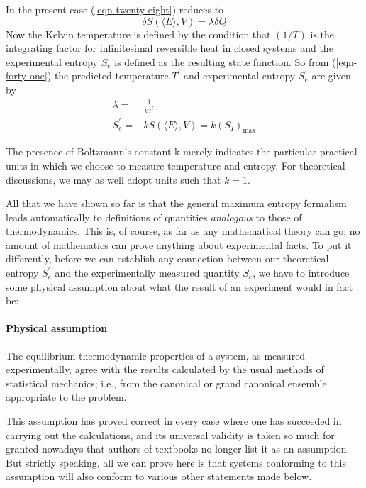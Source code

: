\documentclass[]{article}
\begin{document}
In the present case (\ref{eqn-twenty-eight}) reduces to
\begin{equation}
\delta S(\langle E\rangle, V)=\lambda \delta Q \label{eqn-forty-one}
\end{equation}
Now the Kelvin temperature is defined by the condition that $(1 / T)$ is the integrating factor for infinitesimal reversible heat in closed systems and the experimental entropy $S_{e}$ is defined as the resulting state function. So from (\ref{eqn-forty-one}) the predicted temperature $T^\prime$ and experimental entropy $S _{ e }^{\prime}$ are given by
%
\begin{align}
\lambda= & \frac{1}{ kT ^{\prime}} \\
S _{ e }^{\prime}= & kS (\langle E \rangle, V )= k \left( S _{ I }\right)_{\max }
\end{align}

The presence of Boltzmann's constant k merely indicates the particular practical units in which we choose to measure temperature and entropy. For theoretical discussions, we may as well adopt units such that $k=1$.

All that we have shown so far is that the general maximum entropy formalism leads automatically to definitions of quantities \emph{analogous} to those of thermodynamics. This is, of course, as far as any mathematical theory can go; no amount of mathematics can prove anything about experimental facts. To put it differently, before we can establish any connection between our theoretical entropy $S_{e}^{\prime}$ and the experimentally measured quantity $S_{e}$, we have to introduce some physical assumption about what the result of an experiment would in fact be:

\paragraph{Physical assumption} The equilibrium thermodynamic properties of a system, as measured experimentally, agree with the results calculated by the usual methods of statistical mechanics; i.e., from the canonical or grand canonical ensemble appropriate to the problem. \begin{equation} \label{eqn-forty-four}\end{equation}


This assumption has proved correct in every case where one has succeeded in carrying out the calculations, and its universal validity is taken so much for granted nowadays that authors of textbooks no longer list it as an assumption. But strictly speaking, all we can prove here is that systems conforming to this assumption will also conform to various other statements made below.
\end{document}
